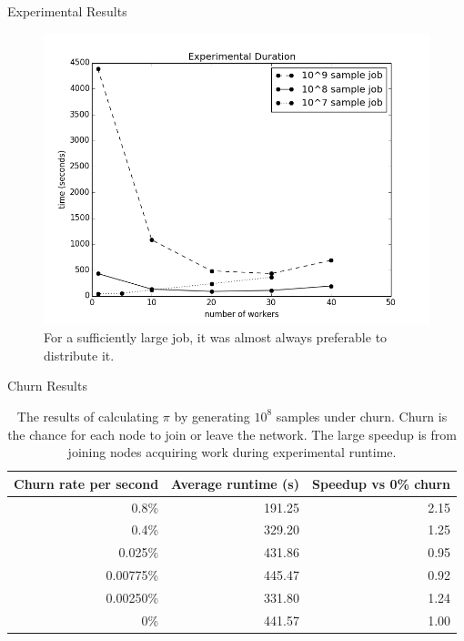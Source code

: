 \documentclass[11pt]{beamer}
\begin{document}
\begin{frame}{Experimental Results}

	\begin{figure}
	    \includegraphics[width=0.75\linewidth]{figs/expTime}
	    \caption{For a sufficiently large job, it was almost always preferable to distribute it.}
	    \label{expTime}
	\end{figure}


\end{frame}



\begin{frame}{Churn Results}
	\begin{table}
		\centering
		\begin{tabular}{|r|r|r|} 
			\hline 
			Churn rate per second & Average runtime (s) & Speedup vs 0\% churn\\ \hline{}
			0.8\% & 191.25 & 2.15 \\ \hline
			0.4\% & 329.20 & 1.25 \\ \hline
			0.025\% & 431.86 & 0.95 \\ \hline 
			0.00775\%  & 445.47 & 0.92 \\ \hline 
			0.00250\% & 331.80  &  1.24 \\ \hline 
			0\% & 441.57 & 1.00 \\ \hline
		\end{tabular}
		\caption{The results of calculating $\pi$ by generating $10^8$ samples under churn. Churn is the chance for each node to join or leave the network. The large speedup is from joining nodes acquiring work during experimental runtime.} 
		\label{tab:churnSpeed}
	\end{table}
	
\end{frame}
\end{document}
